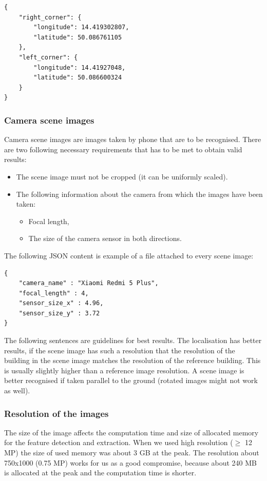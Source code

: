 \documentclass[thesis=B,english]{FITthesis}[2019/12/23]
\begin{document}
                \begin{verbatim}
{
    "right_corner": {
        "longitude": 14.419302807,
        "latitude": 50.086761105
    },
    "left_corner": {
        "longitude": 14.41927048,
        "latitude": 50.086600324
    }
}
                \end{verbatim}
                
            \subsubsection*{Camera scene images}
                Camera scene images are images taken by phone that are to be recognised. There are two following necessary requirements that has to be met to obtain valid results:
                \begin{itemize}
                    \item The scene image must not be cropped (it can be uniformly scaled).
                    \item The following information about the camera from which the images have been taken:
                    \begin{itemize}
                        \item Focal length,
                        \item The size of the camera sensor in both directions.
                    \end{itemize}
                \end{itemize}
                
                The following JSON content is example of a file attached to every scene image:
                \begin{verbatim}
{
    "camera_name" : "Xiaomi Redmi 5 Plus",
    "focal_length" : 4,
    "sensor_size_x" : 4.96,
    "sensor_size_y" : 3.72
}
                \end{verbatim}
                
                The following sentences are guidelines for best results. The localisation has better results, if the scene image has such a resolution that the resolution of the building in the scene image matches the resolution of the reference building. This is usually slightly higher than a reference image resolution. A scene image is better recognised if taken parallel to the ground (rotated images might not work as well).
                
            \subsubsection*{Resolution of the images}
                The size of the image affects the computation time and size of allocated memory for the feature detection and extraction. When we used high resolution (\(\geq\) 12 MP) the size of used memory was about 3 GB at the peak. The resolution about 750x1000 (0.75 MP) works for us as a good compromise, because about 240 MB is allocated at the peak and the computation time is shorter.
            
\end{document}
